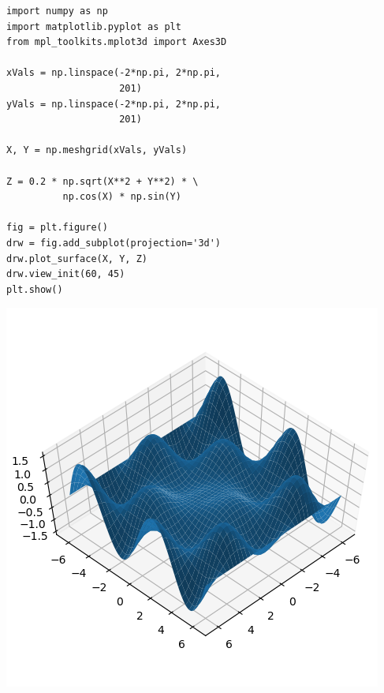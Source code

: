 \begin{frame}[fragile]
%
\begin{tcbraster}[raster columns=2,
                  raster equal height,
                  nobeforeafter,
                  raster column skip=0.5cm]
\begin{codebox}
\begin{verbatim}
import numpy as np
import matplotlib.pyplot as plt
from mpl_toolkits.mplot3d import Axes3D

xVals = np.linspace(-2*np.pi, 2*np.pi,
                    201)
yVals = np.linspace(-2*np.pi, 2*np.pi,
                    201)

X, Y = np.meshgrid(xVals, yVals)

Z = 0.2 * np.sqrt(X**2 + Y**2) * \
          np.cos(X) * np.sin(Y)

fig = plt.figure()
drw = fig.add_subplot(projection='3d')
drw.plot_surface(X, Y, Z)
drw.view_init(60, 45)
plt.show()
\end{verbatim}
\end{codebox}
%
\begin{tcolorbox}[title=Output: Batch Computation]
\includegraphics[width=\linewidth]{./gfx/np-wave}
\end{tcolorbox}
\end{tcbraster}
%
\end{frame}

